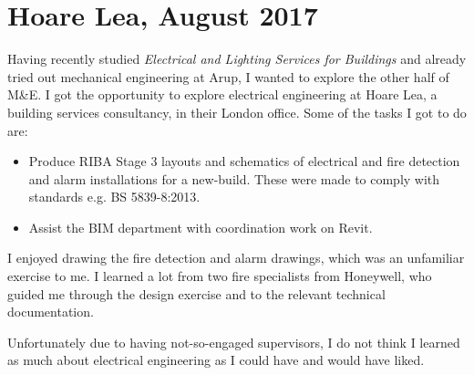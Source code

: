 

\section{Hoare Lea, August 2017}


Having recently studied \textit{Electrical and Lighting Services for Buildings} and already tried out mechanical engineering at Arup, I wanted to explore the other half of M\&E.
I got the opportunity to explore electrical engineering at Hoare Lea, a building services consultancy, in their London office.
Some of the tasks I got to do are:
\begin{itemize}%
	\item Produce RIBA Stage 3 layouts and schematics of electrical and fire detection and alarm installations for a new-build. These were made to comply with standards e.g. BS 5839-8:2013.
	\item Assist the BIM department with coordination work on Revit.
\end{itemize}

I enjoyed drawing the fire detection and alarm drawings, which was an unfamiliar exercise to me.
I learned a lot from two fire specialists from Honeywell, who guided me through the design exercise and to the relevant technical documentation.

Unfortunately due to having not-so-engaged supervisors, I do not think I learned as much about electrical engineering as I could have and would have liked.




